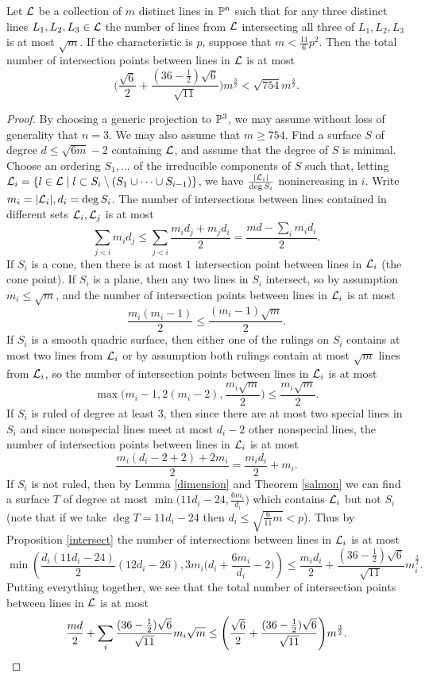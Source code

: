 \begin{thm}[Koll\'ar]\label{3d} Let $\mathcal{L}$ be a collection of $m$ distinct lines in $\mathbb{P}^n$ such that for any three distinct lines $L_1,L_2,L_3 \in \mathcal{L}$ the number of lines from $\mathcal{L}$ intersecting all three of $L_1,L_2,L_3$ is at most $\sqrt{m}$. If the characteristic is $p$, suppose that $m < \frac{11}{6}p^2$. Then the total number of intersection points between lines in $\mathcal{L}$ is at most
\[
\Bigg(\frac{\sqrt{6}}{2}+\frac{(36-\frac{1}{2})\sqrt{6}}{\sqrt{11}}\Bigg)m^{\frac{3}{2}} < \sqrt{754}m^{\frac{3}{2}}.
\]
\end{thm}
\begin{proof} By choosing a generic projection to $\mathbb{P}^3$, we may assume without loss of generality that $n = 3$. We may also assume that $m\ge 754$. Find a surface $S$ of degree $d \le \sqrt{6m}-2$ containing $\mathcal{L}$, and assume that the degree of $S$ is minimal. Choose an ordering $S_1, ...$ of the irreducible components of $S$ such that, letting $\mathcal{L}_i = \{l \in \mathcal{L} \mid l \subset S_i\setminus (S_1\cup\cdots\cup S_{i-1})\}$, we have $\frac{|\mathcal{L}_i|}{\deg S_i}$ nonincreasing in $i$. Write $m_i = |\mathcal{L}_i|, d_i = \deg S_i$. The number of intersections between lines contained in different sets $\mathcal{L}_i, \mathcal{L}_j$ is at most
\[
\sum_{j<i} m_id_j \le \sum_{j<i} \frac{m_id_j + m_jd_i}{2} = \frac{md - \sum_i m_id_i}{2}.
\]
If $S_i$ is a cone, then there is at most $1$ intersection point between lines in $\mathcal{L}_i$ (the cone point). If $S_i$ is a plane, then any two lines in $S_i$ intersect, so by assumption $m_i \le \sqrt{m}$, and the number of intersection points between lines in $\mathcal{L}_i$ is at most
\[
\frac{m_i(m_i-1)}{2} \le \frac{(m_i-1)\sqrt{m}}{2}.
\]
If $S_i$ is a smooth quadric surface, then either one of the rulings on $S_i$ contains at most two lines from $\mathcal{L}_i$ or by assumption both rulings contain at most $\sqrt{m}$ lines from $\mathcal{L}_i$, so the number of intersection points between lines in $\mathcal{L}_i$ is at most
\[
\max\bigg(m_i-1,2(m_i-2),\frac{m_i\sqrt{m}}{2}\bigg) \le \frac{m_i\sqrt{m}}{2}.
\]
If $S_i$ is ruled of degree at least $3$, then since there are at most two special lines in $S_i$ and since nonspecial lines meet at most $d_i-2$ other nonspecial lines, the number of intersection points between lines in $\mathcal{L}_i$ is at most
\[
\frac{m_i(d_i-2+2)+2m_i}{2} = \frac{m_id_i}{2} + m_i.
\]
If $S_i$ is not ruled, then by Lemma \ref{dimension} and Theorem \ref{salmon} we can find a surface $T$ of degree at most $\min\big(11d_i-24,\frac{6m_i}{d_i}\big)$ which contains $\mathcal{L}_i$ but not $S_i$ (note that if we take $\deg T = 11d_i-24$ then $d_i \le \sqrt{\frac{6}{11}m} < p$). Thus by Proposition \ref{intersect} the number of intersections between lines in $\mathcal{L}_i$ is at most
\[
\min\left(\frac{d_i(11d_i-24)}{2}(12d_i-26), 3m_i\Big(d_i + \frac{6m_i}{d_i}-2\Big)\right) \le \frac{m_id_i}{2}+\frac{(36-\frac{1}{2})\sqrt{6}}{\sqrt{11}}m_i^{\frac{3}{2}}.
\]
Putting everything together, we see that the total number of intersection points between lines in $\mathcal{L}$ is at most
\[
\frac{md}{2}+\sum_i \frac{(36-\frac{1}{2})\sqrt{6}}{\sqrt{11}}m_i\sqrt{m} \le \Bigg(\frac{\sqrt{6}}{2}+\frac{(36-\frac{1}{2})\sqrt{6}}{\sqrt{11}}\Bigg)m^{\frac{3}{2}}.\qedhere
\]
\end{proof}


